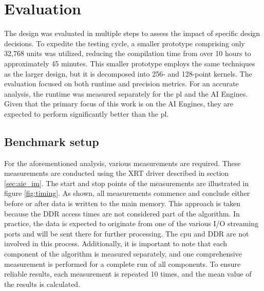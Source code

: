 \chapter{Evaluation}\label{ch:eval}

The design was evaluated in multiple steps to assess the impact of specific design decisions. To expedite the testing cycle, a smaller prototype comprising only 32,768 units was utilized, reducing the compilation time from over 10 hours to approximately 45 minutes. This smaller prototype employs the same techniques as the larger design, but it is decomposed into 256- and 128-point kernels. The evaluation focused on both runtime and precision metrics. For an accurate analysis, the runtime was measured separately for the \ac{pl} and the AI Engines. Given that the primary focus of this work is on the AI Engines, they are expected to perform significantly better than the \ac{pl}.\par

\section{Benchmark setup}
For the aforementioned analysis, various measurements are required. These measurements are conducted using the XRT driver described in section \ref{sec:aie_im}. The start and stop points of the measurements are illustrated in figure \ref{fig:timing}. As shown, all measurements commence and conclude either before or after data is written to the main memory. This approach is taken because the DDR access times are not considered part of the algorithm. In practice, the data is expected to originate from one of the various I/O streaming ports and will be sent there for further processing. The \ac{cpu} and DDR are not involved in this process. Additionally, it is important to note that each component of the algorithm is measured separately, and one comprehensive measurement is performed for a complete run of all components. To ensure reliable results, each measurement is repeated 10 times, and the mean value of the results is calculated.\par

